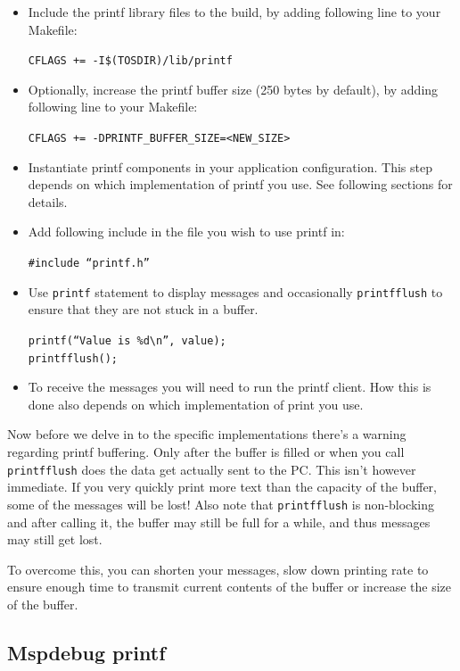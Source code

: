 \begin{itemize}
  \item Include the printf library files to the build, by adding
    following line to your Makefile:

    \texttt{CFLAGS += -I\$(TOSDIR)/lib/printf}

  \item Optionally, increase the printf buffer size (250 bytes by
    default), by adding following line to your Makefile:

    \texttt{CFLAGS += -DPRINTF\_BUFFER\_SIZE=<NEW\_SIZE>}

  \item Instantiate printf components in your application
    configuration. This step depends on which implementation of
    printf you use. See following sections for details.

  \item Add following include in the file you wish to use printf in:

    \texttt{\#include ``printf.h''}

  \item Use \texttt{printf} statement to display messages and
    occasionally \texttt{printfflush} to ensure that they are not stuck
    in a buffer.

    \texttt{printf(``Value is \%d\textbackslash n'', value);} \\
    \texttt{printfflush();}

  \item To receive the messages you will need to run the printf
    client. How this is done also depends on which implementation of
    print you use.
\end{itemize}

Now before we delve in to the specific implementations there's a warning
regarding printf buffering. Only after the buffer is filled or when
you call \texttt{printfflush} does the data get actually sent to the
PC. This isn't however immediate. If you very quickly print more text
than the capacity of the buffer, some of the messages will be lost!
Also note that \texttt{printfflush} is non-blocking and after calling
it, the buffer may still be full for a while, and thus messages
may still get lost.

To overcome this,  you can shorten your messages, slow down printing
rate to ensure enough time to transmit current contents of the buffer
or increase the size of the buffer.

\subsection{Mspdebug printf}

